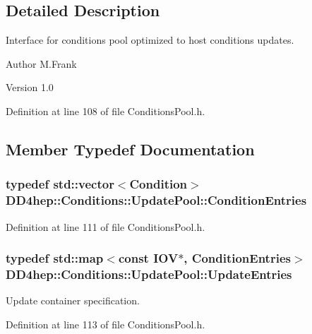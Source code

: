\subsection{Detailed Description}
Interface for conditions pool optimized to host conditions updates. \begin{DoxyAuthor}{Author}
M.Frank 
\end{DoxyAuthor}
\begin{DoxyVersion}{Version}
1.0 
\end{DoxyVersion}


Definition at line 108 of file ConditionsPool.h.

\subsection{Member Typedef Documentation}
\hypertarget{class_d_d4hep_1_1_conditions_1_1_update_pool_ad6bcf36ae0a7dee0a08e1045d8612c6e}{
\subsubsection[{ConditionEntries}]{\setlength{\rightskip}{0pt plus 5cm}typedef std::vector$<${\bf Condition}$>$ {\bf DD4hep::Conditions::UpdatePool::ConditionEntries}}}
\label{class_d_d4hep_1_1_conditions_1_1_update_pool_ad6bcf36ae0a7dee0a08e1045d8612c6e}


Definition at line 111 of file ConditionsPool.h.\hypertarget{class_d_d4hep_1_1_conditions_1_1_update_pool_a1a578a7a025ded412da474be106dc780}{
\subsubsection[{UpdateEntries}]{\setlength{\rightskip}{0pt plus 5cm}typedef std::map$<$const {\bf IOV}$\ast$, {\bf ConditionEntries}$>$ {\bf DD4hep::Conditions::UpdatePool::UpdateEntries}}}
\label{class_d_d4hep_1_1_conditions_1_1_update_pool_a1a578a7a025ded412da474be106dc780}


Update container specification. 

Definition at line 113 of file ConditionsPool.h.

